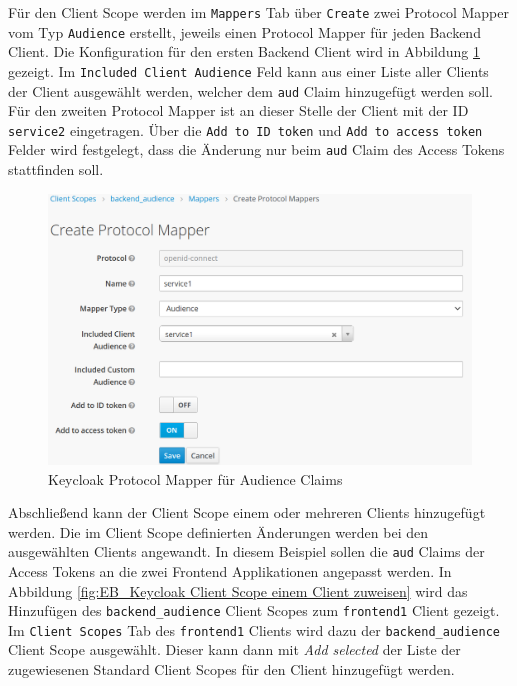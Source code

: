 Für den Client Scope werden im \texttt{Mappers} Tab über \texttt{Create} zwei Protocol Mapper vom Typ \texttt{Audience} erstellt, jeweils einen Protocol Mapper für jeden Backend Client. Die Konfiguration für den ersten Backend Client wird in Abbildung \ref{fig:EB_Keycloak Protocol Mapper für Audience Claim} gezeigt. Im \texttt{Included Client Audience} Feld kann aus einer Liste aller Clients der Client ausgewählt werden, welcher dem \texttt{aud} Claim hinzugefügt werden soll. Für den zweiten Protocol Mapper ist an dieser Stelle der Client mit der ID \texttt{service2} eingetragen. Über die \texttt{Add to ID token} und \texttt{Add to access token} Felder wird festgelegt, dass die Änderung nur beim \texttt{aud} Claim des Access Tokens stattfinden soll.

\begin{figure}[!ht]
	\centering
	\includegraphics[width=1\textwidth]{Images/EbertScherer/KeycloakNewAudProtocolMapper.PNG}
	\caption{Keycloak Protocol Mapper für Audience Claims}
	\label{fig:EB_Keycloak Protocol Mapper für Audience Claim}
\end{figure}

Abschließend kann der Client Scope einem oder mehreren Clients hinzugefügt werden. Die im Client Scope definierten Änderungen werden bei den ausgewählten Clients angewandt. In diesem Beispiel sollen die \texttt{aud} Claims der Access Tokens an die zwei Frontend Applikationen angepasst werden. In Abbildung \ref{fig:EB_Keycloak Client Scope einem Client zuweisen} wird das Hinzufügen des \texttt{backend\_audience} Client Scopes zum \texttt{frontend1} Client gezeigt. Im \texttt{Client Scopes} Tab des \texttt{frontend1} Clients wird dazu der \texttt{backend\_audience} Client Scope ausgewählt. Dieser kann dann mit \textit{Add selected} der Liste der zugewiesenen Standard Client Scopes für den Client hinzugefügt werden.

